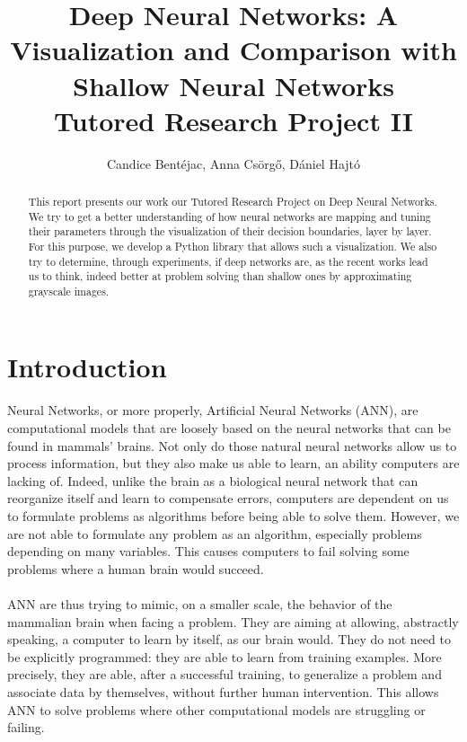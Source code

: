 \documentclass[a4paper]{article}
\title{Deep Neural Networks: A Visualization and Comparison with Shallow Neural Networks\\ \large Tutored Research Project II}
\author{Candice Bent\'ejac, Anna Cs\"org\H o, D\'aniel Hajt\'o}
\begin{document}
\maketitle

\begin{abstract}
This report presents our work our Tutored Research Project on Deep Neural Networks. We try to get a better understanding of how neural networks are mapping and tuning their parameters through the visualization of their decision boundaries, layer by layer. For this purpose, we develop a Python library that allows such a visualization. We also try to determine, through experiments, if deep networks are, as the recent works lead us to think, indeed better at problem solving than shallow ones by approximating grayscale images. 
\end{abstract}

\section{Introduction}

\paragraph{}Neural Networks, or more properly, Artificial Neural Networks (ANN), are computational models that are loosely based on the neural networks that can be found in mammals' brains. Not only do those natural neural networks allow us to process information, but they also make us able to learn, an ability computers are lacking of. Indeed, unlike the brain as a biological neural network that can reorganize itself and learn to compensate errors, computers are dependent on us to formulate problems as algorithms before being able to solve them. However, we are not able to  formulate any problem as an algorithm, especially problems depending on many variables. This causes computers to fail solving some problems where a human brain would succeed. \citep{Krose1996}

\paragraph{}ANN are thus trying to mimic, on a smaller scale, the behavior of the mammalian brain when facing a problem. They are aiming at allowing, abstractly speaking, a computer to learn by itself, as our brain would. They do not need to be explicitly programmed: they are able to learn from training examples. More precisely, they are able, after a successful training, to generalize a problem and associate data by themselves, without further human intervention. This allows ANN to solve problems where other computational models are struggling or failing.
\end{document}
